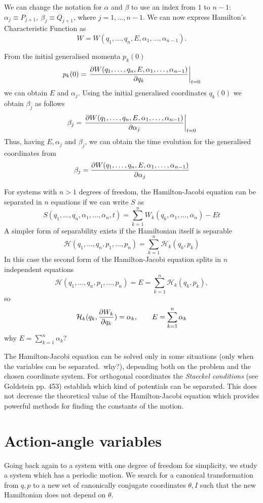 \documentclass[../thesis.tex]{subfiles}
\begin{document}
We can change the notation for \(\alpha \) and \(\beta \) to use an index from \(1\) to \(n-1\):
\(\alpha_j \equiv P_{j+1},\ \beta_j \equiv Q_{j+1}\), where \(j=1,\dotsc,n-1\).
We can now express Hamilton's Characteristic Function as
\[
  W=W(q_1,\dotsc,q_n,E,\alpha_1,\dotsc,\alpha_{n-1}).
\]

From the initial generalised momenta \(p_k(0)\)
\[
  p_k(0) = \eval{\pdv{W(q_1,\dotsc,q_n,E,\alpha_1,\dotsc,\alpha_{n-1})}{q_k}}_{t=0}
\]
we can obtain \(E\) and \(\alpha_j\). Using the initial generalised coordinates \(q_k(0)\)
we obtain \(\beta_j\) as follows
\[
  \beta_j = \eval{\pdv{W(q_1,\dotsc,q_n,E,\alpha_1,\dotsc,\alpha_{n-1})}{\alpha_j}}_{t=0}
\]
Thus, having \(E, \alpha_j\) and \(\beta_j\), we can obtain the time evolution
for the generalised coordinates from
\[
  \beta_j = \pdv{W(q_1,\dotsc,q_n,E,\alpha_1,\dotsc,\alpha_{n-1})}{\alpha_j}
\]

For systems with \(n>1\) degrees of freedom, the Hamilton-Jacobi equation can be separated in
\(n\) equations if we can write \(S\) as
\[
  S(q_1,\dotsc,q_n,\alpha_1,\dotsc,\alpha_n,t) = \sum_{k=1}^n W_k(q_k,\alpha_1,\dotsc,\alpha_n)-Et
\]
A simpler form of separability exists if the Hamiltonian itself is separable
\[
  \mathcal{H}(q_1,\dotsc,q_n,p_1,\dotsc,p_n) = \sum_{k=1}^n \mathcal{H}_k(q_k,p_k)
\]
In this case the second form of the Hamilton-Jacobi equation splits in \(n\) independent equations
\[
  \mathcal{H}(q_1,\dotsc,q_n,p_1,\dotsc,p_n) = E = \sum_{k=1}^n \mathcal{H}_k(q_k,p_k),
\]
so
\[
  \mathcal{H}_k(q_k,\pdv{W_k}{q_k}) = \alpha_k,\qquad E = \sum_{k=1}^n \alpha_k
\]
{\color{red}why \(E = \sum_{k=1}^n \alpha_k\)?}

The Hamilton-Jacobi equation can be solved only in some situations
({\color{red}only when the variables can be separated.\ why?}), depending both on the problem
and the chosen coordinate system. For orthogonal coordinates the \emph{Staeckel conditions}
(see Goldstein pp. 453) establish which kind of potentials can be separated.
This does not decrease the theoretical value of the Hamilton-Jacobi equation which provides
powerful methods for finding the constants of the motion.

\section{Action-angle variables}

Going back again to a system with one degree of freedom for simplicity, we study a system
which has a periodic motion. We search for a canonical transformation from \(q,p\) to
a new set of canonically conjugate coordinates \(\theta, I\) such that the new
Hamiltonian does not depend on \(\theta \).
\end{document}
